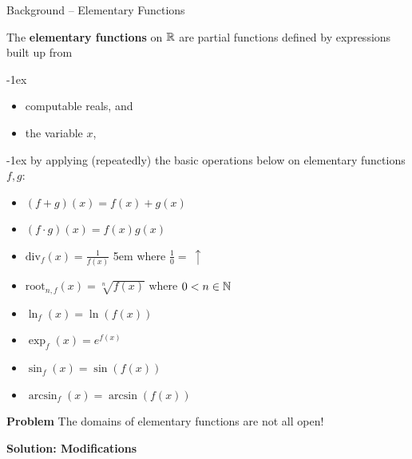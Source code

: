 \begin{frame}{Background -- Elementary Functions}
    \pause \vspace{-2em}
    \begin{minipage}[t]{0.48\linewidth}
        \begin{definition}
            The \textbf{elementary functions} on $\mathbb{R}$  are partial functions deﬁned by expressions built up from 
            \pause

            \kern-1ex
            \begin{itemize}
                \setlength\itemsep{-1pt}
                \item computable reals, and
                \item the variable $x$,
            \end{itemize}
            \kern-1ex
            \pause by applying (repeatedly) the basic operations below on elementary functions $f,g$:
            \pause
            \begin{itemize}
                \setlength\itemsep{-1pt}
                \item $(f+g)(x) = f(x) + g(x)$ 
                \item $(f\cdot g)(x) = f(x)g(x)$
                \item $\mathrm{div}_f(x) = \frac{1}{f(x)}$ \kern5em where $\frac{1}{0} =\ \uparrow$
                \item $\mathrm{root}_{n,f}(x) = \sqrt[n]{f(x)}$ \hfill where $0< n \in \mathbb{N}$
                \item $\ln_f(x) = \ln(f(x))$
                \item $\exp_f(x) = e^{f(x)}$
                \item $\sin_f(x) = \sin(f(x))$
                \item $\arcsin_f(x) = \arcsin(f(x))$
            \end{itemize}
        \end{definition}
    \end{minipage}
    \hfill
    \pause \begin{minipage}[t]{0.45\linewidth}
        \begin{exampleblock}{\textbf{\textcolor{BrickRed}{Problem}}}
            The domains of elementary functions are not all open!
        \end{exampleblock}
        \pause
        \begin{exampleblock}{\color{OliveGreen}\textbf{Solution: Modifications}}

\end{exampleblock}
\end{minipage}
\end{frame}
